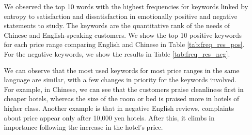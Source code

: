 \documentclass[smallextended,natbib]{svjour3}       %
\begin{document}
    We observed the top 10 words with the highest frequencies for keywords linked by entropy to satisfaction and dissatisfaction in emotionally positive and negative statements to study. The keywords are the quantitative rank of the needs of Chinese and English-speaking customers. We show the top 10 positive keywords for each price range comparing English and Chinese in Table \ref{tab:freq_res_pos}. For the negative keywords, we show the results in Table \ref{tab:freq_res_neg}.

    We can observe that the most used keywords for most price ranges in the same language are similar, with a few changes in priority for the keywords involved. For example, in Chinese, we can see that the customers praise cleanliness first in cheaper hotels, whereas the size of the room or bed is praised more in hotels of higher class. Another example is that in negative English reviews, complaints about price appear only after 10,000 yen hotels. After this, it climbs in importance following the increase in the hotel's price.
\end{document}
